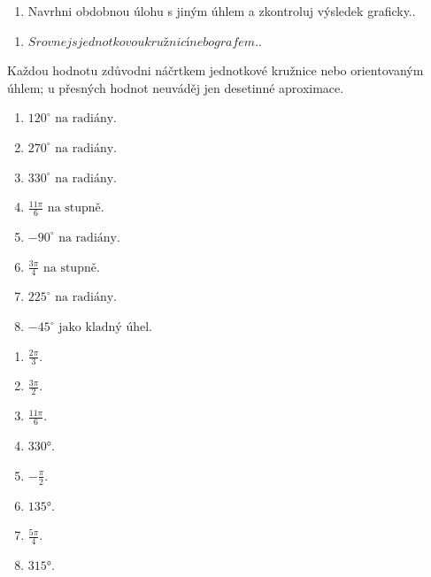 \documentclass[11pt,a4paper]{article}
\begin{document}
\begin{zadaniReseniBox}[title={Rozšíření 1}]
\begin{enumerate}[label=\alph*)]
\item Navrhni obdobnou úlohu s jiným úhlem a zkontroluj výsledek graficky..
\end{enumerate}
\tcblower
\begin{enumerate}[label=\alph*)]
\item $Srovnej s jednotkovou kružnicí nebo grafem.$.
\end{enumerate}
\end{zadaniReseniBox}
Každou hodnotu zdůvodni náčrtkem jednotkové kružnice nebo orientovaným úhlem; u přesných hodnot neuváděj jen desetinné aproximace.
\begin{zadaniReseniBox}[title={Domácí úkol}]
\begin{enumerate}[label=\alph*)]
\item $120^\circ\text{ na radiány}$.
\item $270^\circ\text{ na radiány}$.
\item $330^\circ\text{ na radiány}$.
\item $\frac{11\pi}{6}\text{ na stupně}$.
\item $-90^\circ\text{ na radiány}$.
\item $\frac{3\pi}{4}\text{ na stupně}$.
\item $225^\circ\text{ na radiány}$.
\item $-45^\circ\text{ jako kladný úhel}$.
\end{enumerate}
\tcblower
\begin{enumerate}[label=\alph*)]
\item $\frac{2\pi}{3}$.
\item $\frac{3\pi}{2}$.
\item $\frac{11\pi}{6}$.
\item $330°$.
\item $-\frac{\pi}{2}$.
\item $135°$.
\item $\frac{5\pi}{4}$.
\item $315°$.
\end{enumerate}
\end{zadaniReseniBox}
\end{document}
